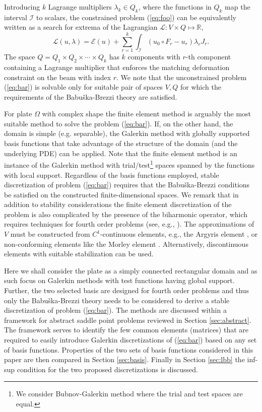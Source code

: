 \documentclass{marine_2015}
\begin{document}
Introducing $k$ Lagrange multipliers $\lambda_k\in Q_k$, where the functions in 
$Q_k$ map the interval $\mathcal{I}$ to scalars, the constrained problem 
(\ref{eq:foo}) can be equivalently written as a search for extrema of the Lagrangian
$\mathcal{L}:V\times Q\mapsto \mathbb{R}$,
\begin{equation}
  \label{eq:bar}
\mathcal{L}\left(u, \lambda\right) = \mathcal{E}\left(u\right) +
  \sum_{r=1}^k\int_{\mathcal{I}}\left(u_0\circ F_r - u_r\right)\lambda_r J_r.
\end{equation}
The space $Q=Q_1\times Q_2\times\cdots\times Q_k$ has $k$ components with $r$-th
component containing a Lagrange multiplier that enforces the matching deformation 
constraint on the beam with index $r$. We note that the unconstrained problem (\ref{eq:bar}) 
is solvable only for suitable pair of spaces $V, Q$ for which the requirements of the
Babu\v{s}ka-Brezzi \cite{babuska, brezzi} theory are satisfied.

For plate $\Omega$ with complex shape the finite element method is arguably 
the most suitable method to solve the problem (\ref{eq:bar}). If, on the other hand, the
domain is simple (e.g. separable), the Galerkin method with globally supported basis functions
that take advantage of the structure of the domain (and the underlying PDE) can 
be applied. Note that the finite element method is an instance of the Galerkin 
method with trial/test\footnote{We consider Bubnov-Galerkin method where the
trial and test spaces are equal.} spaces spanned by the functions with local support. 
Regardless of the basis functions employed, stable discretization of problem (\ref{eq:bar})
requires that the Babu\v{s}ka-Brezzi conditions be satisfied on the constructed
finite-dimensional spaces. We remark that in addition to stability
considerations the finite element discretization of the problem is also complicated
by the presence of the biharmonic operator, which requires techniques for fourth order 
problems (see, e.g., \cite{brenner}). The approximations of $V$ must be constructed 
from $C^1$-continuous elements, e.g., the Argyris element \cite{argyris}, or non-conforming 
elements like the Morley element \cite{morley}. Alternatively, discontinuous elements with 
suitable stabilization \cite{brennerip} can be used. 

Here we shall consider the plate as a simply connected rectangular domain and as
such focus on Galerkin methods with test functions having global support.
Further, the two selected basis are designed for fourth order problems and thus 
only the Babu\v{s}ka-Brezzi theory needs to be considered to derive a stable
discretization of problem (\ref{eq:bar}). The methods are discussed within a
framework for abstract saddle point problems reviewed in Section
\ref{sec:abstract}. The framework serves to identify the few common
elements (matrices) that are required to easily introduce Galerkin discretizations of
(\ref{eq:bar}) based on any set of basis functions. Properties of the two sets of
basis functions considered in this paper are then compared in Section \ref{sec:basis}.
Finally in Section \ref{sec:lbb} the inf-sup condition for the two proposed
discretizations is discussed.
\end{document}
